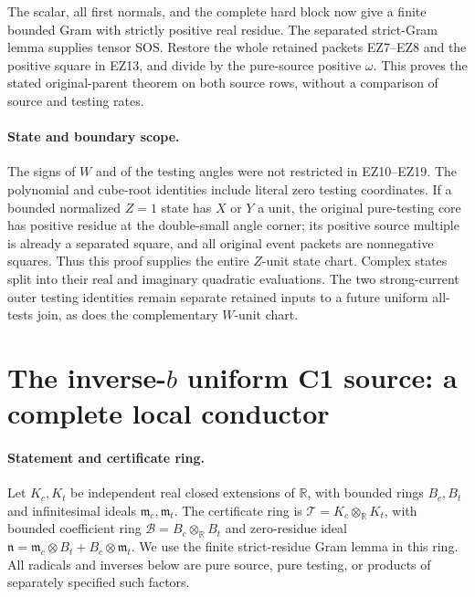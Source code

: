 The scalar, all first normals, and the complete hard block now
give a finite bounded Gram with strictly positive real residue.
The separated strict-Gram lemma supplies tensor SOS.
Restore the whole retained packets EZ7--EZ8 and the positive
square in EZ13, and divide by the pure-source positive $\omega$.
This proves the stated original-parent theorem on both source
rows, without a comparison of source and testing rates.

\paragraph{State and boundary scope.}
The signs of $W$ and of the testing angles were not restricted
in EZ10--EZ19. The polynomial and cube-root identities include
literal zero testing coordinates. If a bounded normalized
$Z=1$ state has $X$ or $Y$ a unit, the original pure-testing
core has positive residue at the double-small angle corner;
its positive source multiple is already a separated square,
and all original event packets are nonnegative squares.
Thus this proof supplies the entire $Z$-unit state chart.
Complex states split into their real and imaginary quadratic
evaluations. The two strong-current outer testing identities
remain separate retained inputs to a future uniform all-tests
join, as does the complementary $W$-unit chart.



\section{\texorpdfstring{The inverse-$b$ uniform C1 source: a complete local conductor}{The inverse-b uniform C1 source: a complete local conductor}}
\label{component:pabbcd0905dcd}

\label{pabbcd0905dcd:sec:c1-inverse-b-local-new}

\paragraph{Statement and certificate ring.}
Let $K_c,K_t$ be independent real closed extensions of $\mathbb R$,
with bounded rings $B_c,B_t$ and infinitesimal ideals
$\mathfrak m_c,\mathfrak m_t$. The certificate ring is
$\mathcal T=K_c\otimes_{\mathbb R}K_t$, with bounded coefficient ring
$\mathcal B=B_c\otimes_{\mathbb R}B_t$ and zero-residue ideal
$\mathfrak n=\mathfrak m_c\otimes B_t+B_c\otimes\mathfrak m_t$.
We use the finite strict-residue Gram lemma in this ring.
All radicals and inverses below are pure source, pure testing, or
products of separately specified such factors.


